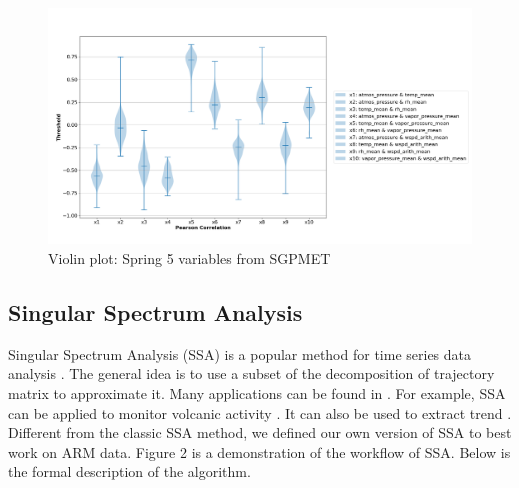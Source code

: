 \documentclass[letterpaper, 10 pt, conference]{ieeeconf}  %
\begin{document}
\begin{figure}[ht]
    \centering
    \includegraphics[width=\textwidth]{Spring.png}
    \caption{Violin plot: Spring 5 variables from SGPMET}
    \label{fig:pc}
\end{figure}

\subsection{Singular Spectrum Analysis}
Singular Spectrum Analysis (SSA) is a popular method for time series data analysis \cite{golyandina2013singular, golyandina2014basic}. The general idea is to use a subset of the decomposition of trajectory matrix to approximate it. Many applications can be found in \cite{golyandina2013singular}. For example, SSA can be applied to monitor volcanic activity \cite{bozzo2010relationship}. It can also be used to extract trend \cite{alexandrov2008method}. Different from the classic SSA method, we defined our own version of SSA to best work on ARM data. Figure 2 is a demonstration of the workflow of SSA. Below is the formal description of the algorithm.
\end{document}
